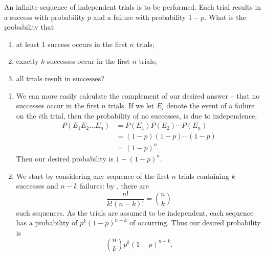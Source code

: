 \begin{changebar}
    \begin{example}
        An infinite sequence of independent trials is to be performed. Each trial results in a success with probability $p$ and a failure with probability $1 - p$. What is the probability that \begin{enumerate}[label=(\alph*)]
            \item at least $1$ success occurs in the first $n$ trials;
            \item exactly $k$ successes occur in the first $n$ trials;
            \item all trials result in successes?
        \end{enumerate}
    \end{example}
    \begin{solution}\hfill
        \begin{enumerate}[label=(\alph*)]
            \item We can more easily calculate the complement of our desired answer -- that no successes occur in the first $n$ trials. If we let $E_i$ denote the event of a failure on the $i$th trial, then the probability of no successes, is due to independence, \[
                \begin{aligned}
                    P(E_1E_2\dots E_n) &= P(E_1)P(E_2)\cdots P(E_n) \\
                    &= (1-p)(1-p)\cdots(1-p) \\
                    &= (1-p)^n. 
                \end{aligned}
            \] Then our desired probability is $1 - (1-p)^n$.

            \item We start by considering any sequence of the first $n$ trials containing $k$ successes and $n - k$ failures: by , there are \[
                \frac{n!}{k!(n-k)!} = {n \choose k}    
            \] such sequences. As the trials are assumed to be independent, each sequence has a probability of $p^k(1-p)^{n-k}$ of occurring. Thus our desired probability is \[
                {n \choose k}p^k(1-p)^{n-k}.    
            \]


\end{enumerate}
\end{solution}
\end{changebar}
